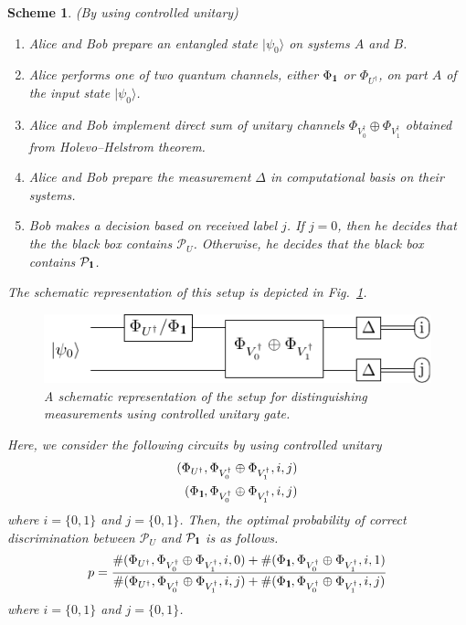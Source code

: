 \documentclass[preprint,12pt, a4paper]{elsarticle}
\newcommand{\ket}[1]{\ensuremath{|#1\rangle}}
\newcommand{\1}{{\rm 1\hspace{-0.9mm}l}}
\newcommand{\Id}{{\rm 1\hspace{-0.9mm}l}}
\newcommand{\PP}{\mathcal{P}}
\newtheorem{scheme}{Scheme}
\begin{document}
\begin{scheme}(By using controlled unitary)
	


\begin{enumerate}
\item Alice and Bob prepare an entangled state $\ket{\psi_{0}}$ on 
systems $A$ and $B$.
\item Alice performs one of two quantum channels, either $\Phi_{\Id}$ or
$\Phi_{U^\dagger}$,  on part $A$ of the input state  $\ket{\psi_{0}}$.
\item Alice and Bob implement  direct sum of unitary channels $\Phi_{V_0^\dagger} \oplus \Phi_{V_1^\dagger}$ obtained from 
Holevo--Helstrom theorem.	
\item Alice and Bob prepare the measurement $\Delta$ in computational basis on 
their systems.
\item Bob makes a decision based on received label $j$. If $j=0$, then he
decides that the the black box contains $\PP_U$. Otherwise, he decides that the
black box contains $\PP_{\Id}$.
\end{enumerate}

The schematic representation of this setup is depicted in 
Fig.~\ref{fig:controlled}.     
\begin{figure}[h!]
	\centering 
	\includegraphics[scale=1.5]{pics/controlled_unitary} 
	
	\caption{ A schematic representation of the setup for distinguishing
		measurements using controlled unitary gate. 
	}\label{fig:controlled}
\end{figure} 


Here, we consider the following circuits
by using controlled unitary
\begin{equation}
\begin{split}
(\Phi_{U^\dagger}, \Phi_{V_0^\dagger} \oplus \Phi_{V_1^\dagger}, i, j) \\ 
(\Phi_{\Id},  \Phi_{V_0^\dagger} \oplus \Phi_{V_1^\dagger}, i, j)
\end{split}
\end{equation}
where $i=\{0,1\}$ and $ j=\{0,1\}$. 
Then, the optimal probability of correct discrimination between $\PP_{U} $ and $\PP_\Id$ is as follows.
\begin{equation}
p = \frac{\#(\Phi_{U^\dagger},\Phi_{V_0^\dagger} \oplus \Phi_{V_1^\dagger},i,0) + \#(\Phi_\Id,\Phi_{V_0^\dagger} \oplus \Phi_{V_1^\dagger},i,1) }{\#(\Phi_{U^\dagger},\Phi_{V_0^\dagger} \oplus \Phi_{V_1^\dagger},i,j) + \#(\Phi_\Id,\Phi_{V_0^\dagger} \oplus \Phi_{V_1^\dagger},i,j)}
\end{equation}
where $i=\{0,1\}$ and $ j=\{0,1\}$. 
\end{scheme}
\end{document}
